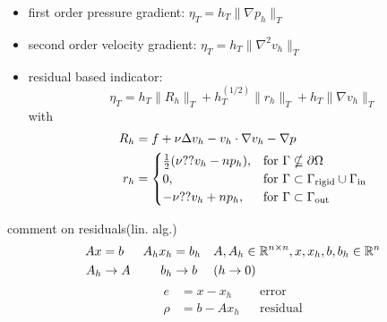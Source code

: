 \begin{example}
\begin{itemize}
		\item first order pressure gradient:  $\eta_T = h_T \|\nabla p_h\|_T$
		\item second order velocity gradient:  $\eta_T = h_T \|\nabla^2 v_h\|_T$
		\item residual based indicator: 
		\begin{equation*}
			\eta_T = h_T \|R_h\|_T +  h_T^{(1/2)} \|r_h\|_T + h_T \|\nabla v_h\|_T
		\end{equation*}
		with 
		\begin{align*}
			R_h &= f + \nu \Delta v_h - v_h \cdot \nabla v_h -  \nabla p \\
			r_h &= 
			\begin{cases}
				\frac{1}{2}(\nu ?? v_h - n p_h), &\text{for }\Gamma \nsubseteq \partial \Omega\\
				0 ,&\text{for }\Gamma \subset \Gamma_{\text{rigid}}\cup\Gamma_{\text{in}}\\
				-\nu ?? v_h + n p_h, &\text{for }\Gamma \subset \Gamma_{\text{out}}
			\end{cases} 
		\end{align*}
	\end{itemize}
	comment on residuals(lin. alg.)\nl
	\begin{align*}
		Ax&=b &  A_h x_h &= b_h &&A,A_h \in \mathbb{R}^{n\times n},x,x_h,b,b_h\in\mathbb{R}^n \\
		A_h&\to A & b_h &\to b  &&(h\to 0)\\
	\end{align*}
	\begin{align*}
		e&= x-x_h &&\text{error}\\
		\rho&= b-Ax_h&&\text{residual}
	\end{align*}
\end{example}
